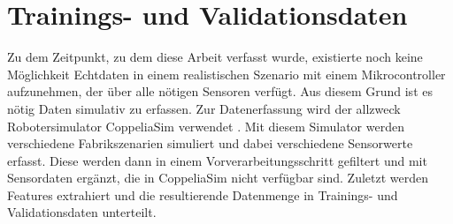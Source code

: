 \chapter{Trainings- und Validationsdaten}
Zu dem Zeitpunkt, zu dem diese Arbeit verfasst wurde, existierte noch keine Möglichkeit Echtdaten in einem
realistischen Szenario mit einem Mikrocontroller aufzunehmen, der über alle nötigen Sensoren verfügt.
Aus diesem Grund ist es nötig Daten simulativ zu erfassen.
\newline
\newline
Zur Datenerfassung wird der allzweck Robotersimulator CoppeliaSim verwendet \cite{coppeliaSim}.
Mit diesem Simulator werden verschiedene Fabrikszenarien simuliert und dabei verschiedene Sensorwerte erfasst.
Diese werden dann in einem Vorverarbeitungsschritt gefiltert und mit Sensordaten ergänzt, die in CoppeliaSim nicht verfügbar sind.
Zuletzt werden Features extrahiert und die resultierende Datenmenge in Trainings- und Validationsdaten unterteilt.





